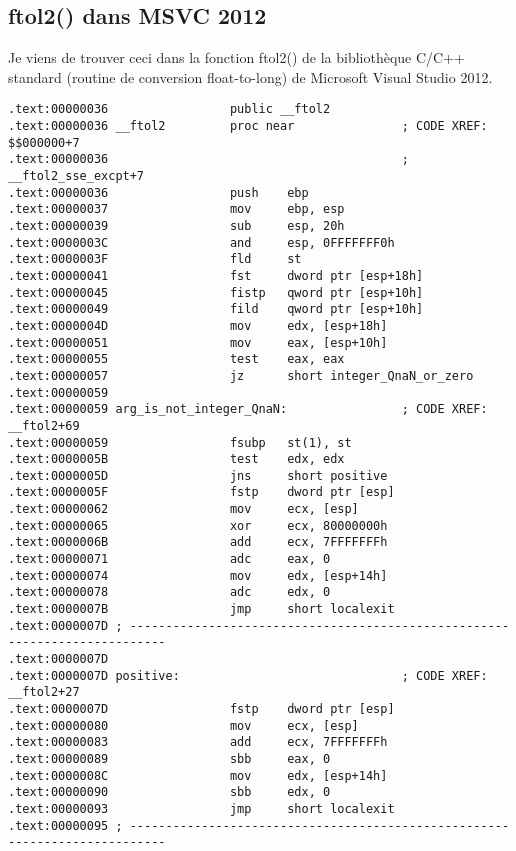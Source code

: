 
\subsection{ftol2() dans MSVC 2012}

Je viens de trouver ceci dans la fonction ftol2() de la bibliothèque C/C++ standard
(routine de conversion float-to-long) de Microsoft Visual Studio 2012.

\begin{lstlisting}
.text:00000036                 public __ftol2
.text:00000036 __ftol2         proc near               ; CODE XREF: $$000000+7
.text:00000036                                         ; __ftol2_sse_excpt+7
.text:00000036                 push    ebp
.text:00000037                 mov     ebp, esp
.text:00000039                 sub     esp, 20h
.text:0000003C                 and     esp, 0FFFFFFF0h
.text:0000003F                 fld     st
.text:00000041                 fst     dword ptr [esp+18h]
.text:00000045                 fistp   qword ptr [esp+10h]
.text:00000049                 fild    qword ptr [esp+10h]
.text:0000004D                 mov     edx, [esp+18h]
.text:00000051                 mov     eax, [esp+10h]
.text:00000055                 test    eax, eax
.text:00000057                 jz      short integer_QnaN_or_zero
.text:00000059
.text:00000059 arg_is_not_integer_QnaN:                ; CODE XREF: __ftol2+69
.text:00000059                 fsubp   st(1), st
.text:0000005B                 test    edx, edx
.text:0000005D                 jns     short positive
.text:0000005F                 fstp    dword ptr [esp]
.text:00000062                 mov     ecx, [esp]
.text:00000065                 xor     ecx, 80000000h
.text:0000006B                 add     ecx, 7FFFFFFFh
.text:00000071                 adc     eax, 0
.text:00000074                 mov     edx, [esp+14h]
.text:00000078                 adc     edx, 0
.text:0000007B                 jmp     short localexit
.text:0000007D ; ---------------------------------------------------------------------------
.text:0000007D
.text:0000007D positive:                               ; CODE XREF: __ftol2+27
.text:0000007D                 fstp    dword ptr [esp]
.text:00000080                 mov     ecx, [esp]
.text:00000083                 add     ecx, 7FFFFFFFh
.text:00000089                 sbb     eax, 0
.text:0000008C                 mov     edx, [esp+14h]
.text:00000090                 sbb     edx, 0
.text:00000093                 jmp     short localexit
.text:00000095 ; ---------------------------------------------------------------------------

\end{lstlisting}
